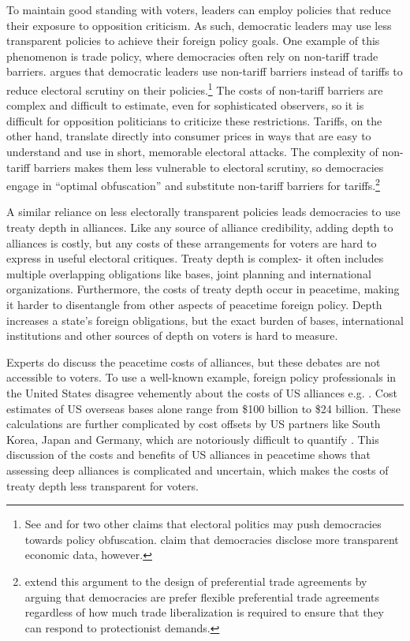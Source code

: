 \documentclass[12pt]{article}
\begin{document}
To maintain good standing with voters, leaders can employ policies that reduce their exposure to opposition criticism.
As such, democratic leaders may use less transparent policies to achieve their foreign policy goals.  
One example of this phenomenon is trade policy, where democracies often rely on non-tariff trade barriers.
\citet{Kono2006} argues that democratic leaders use non-tariff barriers instead of tariffs to reduce electoral scrutiny on their policies.\footnote{See \citet{Rejali2007} and \citet{Stasavage2004} for two other claims that electoral politics may push democracies towards policy obfuscation. \citet{Hollyeretal2011} claim that democracies disclose more transparent economic data, however.}
The costs of non-tariff barriers are complex and difficult to estimate, even for sophisticated observers, so it is difficult for opposition politicians to criticize these restrictions. 
Tariffs, on the other hand, translate directly into consumer prices in ways that are easy to understand and use in short, memorable electoral attacks.
The complexity of non-tariff barriers makes them less vulnerable to electoral scrutiny, so democracies engage in ``optimal obfuscation'' and substitute non-tariff barriers for tariffs.\footnote{\citet{Baccinietal2015} extend this argument to the design of preferential trade agreements by arguing that democracies are prefer flexible preferential trade agreements regardless of how much trade liberalization is required to ensure that they can respond to protectionist demands.}  


A similar reliance on less electorally transparent policies leads democracies to use treaty depth in alliances. 
Like any source of alliance credibility, adding depth to alliances is costly, but any costs of these arrangements for voters are hard to express in useful electoral critiques.
Treaty depth is complex- it often includes multiple overlapping obligations like bases, joint planning and international organizations.
Furthermore, the costs of treaty depth occur in peacetime, making it harder to disentangle from other aspects of peacetime foreign policy. 
Depth increases a state's foreign obligations, but the exact burden of bases, international institutions and other sources of depth on voters is hard to measure. 


Experts do discuss the peacetime costs of alliances, but these debates are not accessible to voters. 
To use a well-known example, foreign policy professionals in the United States disagree vehemently about the costs of US alliances e.g. \citep{Brooksetal2013, Posen2014, BrandsFeaver2017}.
Cost estimates of US overseas bases alone range from \$100 billion \citep{Vine2015} to \$24 billion. 
These calculations are further complicated by cost offsets by US partners like South Korea, Japan and Germany, which are notoriously difficult to quantify \citep{Lostumboetal2013}.  
This discussion of the costs and benefits of US alliances in peacetime shows that assessing deep alliances is complicated and uncertain, which makes the costs of treaty depth less transparent for voters. 
\end{document}
